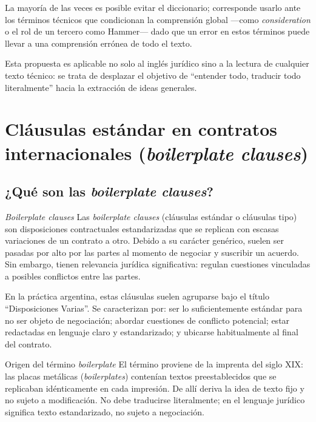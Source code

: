 \documentclass[12pt,oneside]{book}
\begin{document}
La mayoría de las veces es posible evitar el diccionario; corresponde usarlo ante los términos técnicos que condicionan la comprensión global ---como \textit{consideration} o el rol de un tercero como Hammer--- dado que un error en estos términos puede llevar a una comprensión errónea de todo el texto.

Esta propuesta es aplicable no solo al inglés jurídico sino a la lectura de cualquier texto técnico: se trata de desplazar el objetivo de ``entender todo, traducir todo literalmente'' hacia la extracción de ideas generales.

\chapter{Cláusulas estándar en contratos internacionales (\textit{boilerplate clauses})}
\label{cap:boilerplate}

\section{¿Qué son las \textit{boilerplate clauses}?}

\begin{definition}{\textit{Boilerplate clauses}}
Las \textit{boilerplate clauses} (cláusulas estándar o cláusulas tipo) son disposiciones contractuales estandarizadas que se replican con escasas variaciones de un contrato a otro. Debido a su carácter genérico, suelen ser pasadas por alto por las partes al momento de negociar y suscribir un acuerdo. Sin embargo, tienen relevancia jurídica significativa: regulan cuestiones vinculadas a posibles conflictos entre las partes.
\end{definition}

En la práctica argentina, estas cláusulas suelen agruparse bajo el título ``Disposiciones Varias''. Se caracterizan por: ser lo suficientemente estándar para no ser objeto de negociación; abordar cuestiones de conflicto potencial; estar redactadas en lenguaje claro y estandarizado; y ubicarse habitualmente al final del contrato.

\begin{definition}{Origen del término \textit{boilerplate}}
El término proviene de la imprenta del siglo XIX: las placas metálicas (\textit{boilerplates}) contenían textos preestablecidos que se replicaban idénticamente en cada impresión. De allí deriva la idea de texto fijo y no sujeto a modificación. No debe traducirse literalmente; en el lenguaje jurídico significa texto estandarizado, no sujeto a negociación.
\end{definition}
\end{document}
